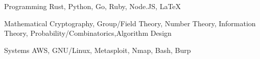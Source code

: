 


\begin{cvskills}


\cvskill
{Programming} %
{Rust, Python, Go, Ruby, Node.JS, LaTeX} %


\cvskill
{Mathematical} %
{Cryptography, Group/Field Theory, Number Theory, Information Theory, Probability/Combinatorics,\newline Algorithm Design} %


\cvskill
{Systems} %
{AWS, GNU/Linux, Metasploit, Nmap, Bash, Burp} %






\end{cvskills}
